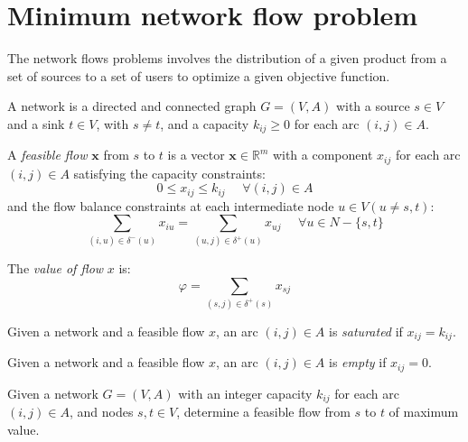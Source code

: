 \documentclass[12pt, a4paper]{report}
\begin{document}
    \section{Minimum network flow problem}
    The network flows problems involves the distribution of a given product from a set of sources to a set of users to optimize a given objective function. 
    \begin{definition}
        A network is a directed and connected graph $G = (V,A)$ with a source $s \in V$ and a sink $t \in V$, with $s \neq t$, and a capacity $k_{ij} \geq 0$ for each arc 
        $(i,j) \in A$. 

        A \emph{feasible flow} $\boldsymbol{x}$ from $s$ to $t$ is a vector $\boldsymbol{x} \in \mathbb{R}^m$ with a component $x_{ij}$ for each arc $(i,j) \in A$ satisfying the capacity constraints:
        \[0 \leq x_{ij} \leq k_{ij} \:\:\:\:\:\: \forall (i,j) \in A\]
        and the flow balance constraints at each intermediate node $u \in V (u \neq s,t)$: 
        \[\sum_{(i,u)\in \delta^{-}(u)}x_{iu}=\sum_{(u,j)\in \delta^{+}(u)}x_{uj} \:\:\:\:\:\: \forall u \in N-\{s,t\}\]

        The \emph{value of flow} $x$ is:
        \[\varphi = \sum_{(s,j) \in \delta^{+}(s)} x_{sj}\]

        Given a network and a feasible flow $x$, an arc $(i,j) \in A$ is \emph{saturated} if $x_{ij} = k_{ij}$. 

        Given a network and a feasible flow $x$, an arc $(i,j) \in A$ is \emph{empty} if $x_{ij} = 0$. 
    \end{definition}
    Given a network $G = (V,A)$ with an integer capacity $k_{ij}$ for each arc $(i,j) \in A$, and nodes $s,t \in V$, determine a feasible flow from $s$ to $t$ of maximum value. 
\end{document}
